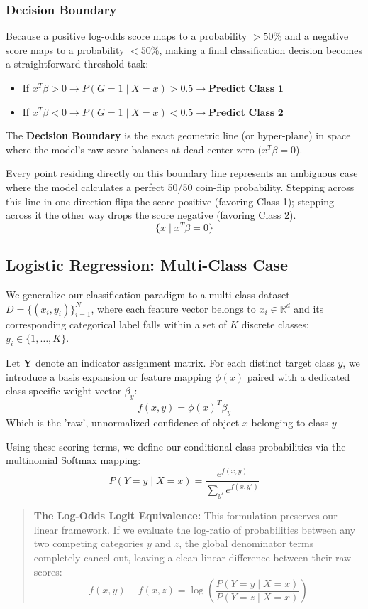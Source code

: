 \documentclass{article}
\begin{document}
\subsubsection{Decision Boundary}
Because a positive log-odds score maps to a probability $> 50\%$ and a negative score maps to a probability $< 50\%$, making a final classification decision becomes a straightforward threshold task:
\begin{itemize}
  \item If $x^T\beta > 0 \longrightarrow P(G=1 \mid X=x) > 0.5 \longrightarrow \textbf{Predict Class 1}$
  \item If $x^T\beta < 0 \longrightarrow P(G=1 \mid X=x) < 0.5 \longrightarrow \textbf{Predict Class 2}$
\end{itemize}

The \textbf{Decision Boundary} is the exact geometric line (or hyper-plane) in space where the model's raw score balances at dead center zero ($x^T\beta = 0$).



Every point residing directly on this boundary line represents an ambiguous case where the model calculates a perfect 50/50 coin-flip probability. Stepping across this line in one direction flips the score positive (favoring Class 1); stepping across it the other way drops the score negative (favoring Class 2).
\[ \{x \mid x^T\beta = 0\} \]
\subsection{Logistic Regression: Multi-Class Case}
We generalize our classification paradigm to a multi-class dataset $D = \{(x_i, y_i)\}_{i=1}^N$, where each feature vector belongs to $x_i \in \mathbb{R}^d$ and its corresponding categorical label falls within a set of $K$ discrete classes: $y_i \in \{1, \dots, K\}$.

Let $\mathbf{Y}$ denote an indicator assignment matrix. For each distinct target class $y$, we introduce a basis expansion or feature mapping $\phi(x)$ paired with a dedicated class-specific weight vector $\beta_y$:
\[ f(x, y) = \phi(x)^T\beta_y \]
Which is the 'raw', unnormalized confidence of object $x$ belonging to class $y$

Using these scoring terms, we define our conditional class probabilities via the multinomial Softmax mapping:
\[ P(Y = y \mid X = x) = \frac{e^{f(x,y)}}{\sum_{y'} e^{f(x,y')}} \]

\begin{quote}
\textbf{The Log-Odds Logit Equivalence:} This formulation preserves our linear framework. If we evaluate the log-ratio of probabilities between any two competing categories $y$ and $z$, the global denominator terms completely cancel out, leaving a clean linear difference between their raw scores:
\[ f(x, y) - f(x, z) = \log\left( \frac{P(Y = y \mid X = x)}{P(Y = z \mid X = x)} \right) \]
\end{quote}
\end{document}
